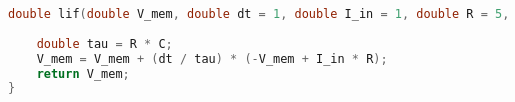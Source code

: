 \begin{lstlisting}[language=C++, caption={Implementação em C++ do potencial de ação decrescente de um LIF: $I_{in}=1$}, label={lst:membranepotentialincrease}]
double lif(double V_mem, double dt = 1, double I_in = 1, double R = 5, double C = 1) {
	
	double tau = R * C;
	V_mem = V_mem + (dt / tau) * (-V_mem + I_in * R);
	return V_mem;
}
\end{lstlisting}